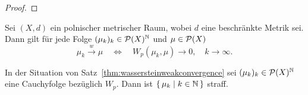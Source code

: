 \documentclass[../main/main.tex]{subfiles}
\begin{document}
	\begin{proof}
	\end{proof}

	\begin{Satz}
		\label{thm:wassersteinweakconvergence}
		Sei $(X, d)$ ein polnischer metrischer Raum, wobei $d$ eine beschränkte Metrik sei. Dann gilt
		für jede Folge $(\mu_k)_k \in \mathcal{P}(X)^{\mathbb{N}}$ und $\mu \in \mathcal{P}(X)$
		\[ \mu_k \xrightarrow{w} \mu \quad \iff \quad W_p(\mu_k, \mu) \to 0, \quad k \to \infty \text{.} \]
	\end{Satz}

	\begin{Hilfssatz}
		\label{lem:wassersteincauchyseq}
		In der Situation von Satz~\ref{thm:wassersteinweakconvergence} sei $(\mu_k)_k \in \mathcal{P}(X)^{\mathbb{N}}$ eine Cauchyfolge
		bezüglich $W_p$. Dann ist $\left\{\, \mu_k \; \middle| \; k \in \mathbb{N} \,\right\}$ straff.
	\end{Hilfssatz}
\end{document}

